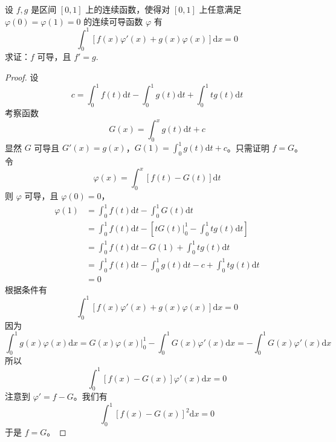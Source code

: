 \documentclass[../../main.tex]{subfiles}
\begin{document}
\begin{example}
设 \( f,g \) 是区间 \([0,1]\) 上的连续函数，使得对 \([0,1]\) 上任意满足 \( \varphi(0) = \varphi(1) = 0 \) 的连续可导函数 \( \varphi \) 有
\[
\int_{0}^{1} \left[ f(x)\varphi'(x) + g(x)\varphi(x) \right] \mathrm{d}x = 0
\]
求证：\( f \) 可导，且 \( f' = g \).
\end{example}
\begin{proof}
设
\[
c = \int_{0}^{1} f(t)\mathrm{d}t - \int_{0}^{1} g(t)\mathrm{d}t + \int_{0}^{1} tg(t)\mathrm{d}t
\]
考察函数
\[
G(x) = \int_{0}^{x} g(t)\mathrm{d}t + c
\]
显然 \( G \) 可导且 \( G'(x) = g(x) \)，\( G(1) = \int_{0}^{1} g(t)\mathrm{d}t + c \)。只需证明 \( f = G \)。令
\[
\varphi(x) = \int_{0}^{x} \left[ f(t) - G(t) \right] \mathrm{d}t
\]
则 \( \varphi \) 可导，且 \( \varphi(0) = 0 \)，
\begin{align*}
\varphi(1) &= \int_{0}^{1} f(t)\mathrm{d}t - \int_{0}^{1} G(t)\mathrm{d}t \\
&= \int_{0}^{1} f(t)\mathrm{d}t - \left[ tG(t)\big|_{0}^{1} - \int_{0}^{1} tg(t)\mathrm{d}t \right] \\
&= \int_{0}^{1} f(t)\mathrm{d}t - G(1) + \int_{0}^{1} tg(t)\mathrm{d}t \\
&= \int_{0}^{1} f(t)\mathrm{d}t - \int_{0}^{1} g(t)\mathrm{d}t - c + \int_{0}^{1} tg(t)\mathrm{d}t \\
&= 0
\end{align*}
根据条件有
\[
\int_{0}^{1} \left[ f(x)\varphi'(x) + g(x)\varphi(x) \right] \mathrm{d}x = 0
\]
因为
\[
\int_{0}^{1} g(x)\varphi(x)\mathrm{d}x = G(x)\varphi(x)\big|_{0}^{1} - \int_{0}^{1} G(x)\varphi'(x)\mathrm{d}x = -\int_{0}^{1} G(x)\varphi'(x)\mathrm{d}x
\]
所以
\[
\int_{0}^{1} \left[ f(x) - G(x) \right] \varphi'(x)\mathrm{d}x = 0
\]
注意到 \( \varphi' = f - G \)。我们有
\[
\int_{0}^{1} \left[ f(x) - G(x) \right]^{2} \mathrm{d}x = 0
\]
于是 \( f = G \)。

\end{proof}
\end{document}
